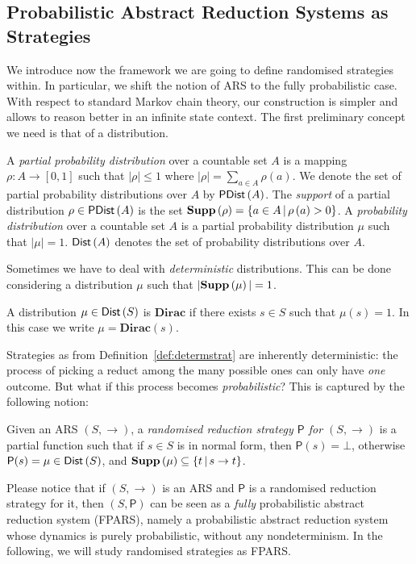 \subsection{Probabilistic Abstract Reduction Systems as Strategies}
We introduce now the framework we are going to define randomised
strategies within. In particular, we shift the notion of ARS to the fully
probabilistic case. With respect to standard Markov chain theory, our
construction is simpler and allows to reason better in an infinite
state context. The first preliminary concept we need is that of a distribution.
\begin{definition}[Distribution]
	A \emph{partial probability distribution} over a countable set $A$
	is a mapping $\rho:A\rightarrow\left[0,1\right]$ such that
	$\left|\rho\right|\leq 1$ where
	$\left|\rho\right|=\underset{a\in A}{\sum}\rho\left(a\right)$. We denote the set of partial probability distributions over $A$
	by $\textsf{PDist}\left(A\right)$. The \emph{support} of a partial distribution
	$\rho\in\textsf{PDist}\left(A\right)$ is the set $\textbf{Supp}\left(\rho\right)=\left\lbrace a \in A \, |
	\, \rho\left( a\right) >0\right\rbrace $.  A \emph{probability
		distribution} over a countable set $A$ is a partial probability
	distribution $\mu$ such that $\left|\mu\right|=1$. $\textsf{Dist}\left(A\right)$ denotes the set
	of probability distributions over $A$.
\end{definition}
Sometimes we have to deal with \emph{deterministic} distributions. This can be done considering a distribution $\mu$ such that $|\textbf{Supp}\left(\mu\right)|=1$.
\begin{definition}
	A distribution $\mu\in\textsf{Dist}\left(S\right)$ is $\textbf{Dirac}$ if there exists $s\in S$ such that $\mu(s)=1$. In this case we write $\mu=\textbf{Dirac}(s)$.
\end{definition}
Strategies as from Definition~\ref{def:determstrat} are inherently
deterministic: the process of picking a reduct among the many possible
ones can only have \emph{one} outcome. But what if this process becomes
\emph{probabilistic}? This is captured by the following notion:
\begin{definition}
	Given an ARS $(S,\rightarrow)$, a
	\emph{randomised reduction strategy $\mathsf{P}$ for $(S,\rightarrow)$}
	is a partial function such that if $s\in S$ is in normal form, then
	$\mathsf{P}(s)=\bot$, otherwise $\mathsf{P}(s)=\mu\in\textsf{Dist}\left(S\right)$, and
	$\textbf{Supp}\left(\mu\right)\subseteq\{t\,|\,s\rightarrow t\}$.
\end{definition}
Please notice that if $(S,\rightarrow)$ is an ARS and 
$\mathsf{P}$ is a randomised reduction strategy for it,
then $(S,\mathsf{P})$ can be seen as a \emph{fully} probabilistic abstract
reduction system (FPARS), namely a probabilistic abstract reduction
system~\cite{avanzini_probabilistic_2018} whose dynamics is purely
probabilistic, without any nondeterminism. In the following, we will
study randomised strategies as FPARS.

